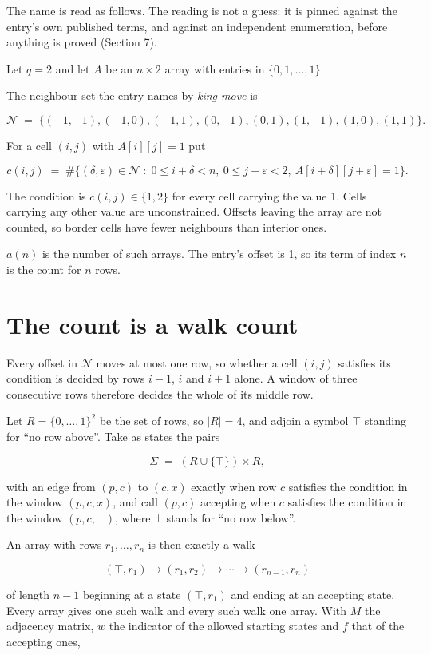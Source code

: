 \documentclass[11pt]{article}
\theoremstyle{definition}
\begin{document}
The name is read as follows. The reading is not a guess: it is pinned against the entry's own published terms, and against an independent enumeration, before anything is proved (Section 7).

Let $q = 2$ and let $A$ be an $n \times 2$ array with entries in $\{0,1,\dots,1\}$.

The neighbour set the entry names by {\itshape king-move} is

\[\mathcal{N} \;=\; \{(-1,-1), (-1,0), (-1,1), (0,-1), (0,1), (1,-1), (1,0), (1,1)\}.\]

For a cell $(i,j)$ with $A[i][j] = 1$ put

\[c(i,j) \;=\; \#\bigl\{(\delta,\varepsilon)\in\mathcal{N} \;:\; 0\le i+\delta<n,\ 0\le j+\varepsilon<2,\ A[i+\delta][j+\varepsilon] = 1\bigr\}.\]

The condition is $c(i,j) \in \{1, 2\}$ for every cell carrying the value 1. Cells carrying any other value are unconstrained. Offsets leaving the array are not counted, so border cells have fewer neighbours than interior ones.

$a(n)$ is the number of such arrays. The entry's offset is 1, so its term of index $n$ is the count for $n$ rows.

\section{The count is a walk count}

Every offset in $\mathcal{N}$ moves at most one row, so whether a cell $(i,j)$ satisfies its condition is decided by rows $i-1$, $i$ and $i+1$ alone. A window of three consecutive rows therefore decides the whole of its middle row.

Let $R = \{0,\dots,1\}^{2}$ be the set of rows, so $|R| = 4$, and adjoin a symbol $\top$ standing for ``no row above''. Take as states the pairs

\[\Sigma \;=\; (R \cup \{\top\}) \times R,\]

with an edge from $(p,c)$ to $(c,x)$ exactly when row $c$ satisfies the condition in the window $(p,c,x)$, and call $(p,c)$ accepting when $c$ satisfies the condition in the window $(p,c,\bot)$, where $\bot$ stands for ``no row below''.

An array with rows $r_1,\dots,r_n$ is then exactly a walk

\[(\top,r_1) \to (r_1,r_2) \to \cdots \to (r_{n-1},r_n)\]

of length $n-1$ beginning at a state $(\top,r_1)$ and ending at an accepting state. Every array gives one such walk and every such walk one array. With $M$ the adjacency matrix, $w$ the indicator of the allowed starting states and $f$ that of the accepting ones,
\end{document}
